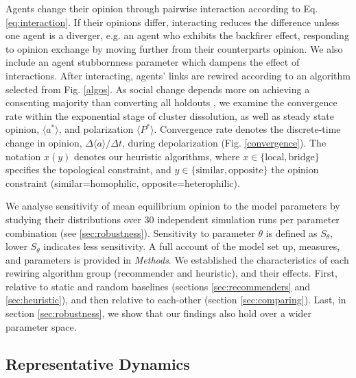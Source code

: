 \documentclass[unnumsec,webpdf,contemporary,large]{oup-authoring-template}%
\theoremstyle{thmstyleone}%
\theoremstyle{thmstyletwo}%
\theoremstyle{thmstylethree}%
\begin{document}
Agents change their opinion through pairwise interaction according to Eq. \ref{eq:interaction}. If their opinions differ, interacting reduces the difference unless one agent is a diverger, e.g. an agent who exhibits the backfirer effect, responding to opinion exchange by moving further from their counterparts opinion. We also include an agent stubbornness parameter which dampens the effect of  interactions. After interacting, agents' links are rewired according to an algorithm selected from Fig. \ref{algos}. As social change depends more on achieving a consenting majority than converting all holdouts \citep{andersson_dynamics_2021,otto_social_2020,gardiner_perfect_2011}, we examine the convergence rate within the exponential stage of cluster dissolution, as well as steady state opinion, $\langle a^* \rangle$, and polarization $\langle P^* \rangle$. Convergence rate denotes the discrete-time change in opinion, $\Delta\langle a\rangle/\Delta t$, during depolarization (Fig. \ref{convergence}). The notation $x(y)$ denotes our heuristic algorithms, where $x \in \{\text{local}, \text{bridge}\}$ specifies the topological constraint, and $y \in \{\text{similar}, \text{opposite}\}$ the opinion constraint (similar=homophilic, opposite=heterophilic).

We analyse sensitivity of mean equilibrium opinion to the model parameters by studying their distributions over 30 independent simulation runs per parameter combination (see \ref{sec:robustness}). Sensitivity to parameter $\theta$ is defined as $S_{\theta}$, lower $S_\theta$ indicates less sensitivity. A full account of the model set up, measures, and parameters is provided in \textit{Methods}. We established the characteristics of each rewiring algorithm group (recommender and heuristic), and their effects. First, relative to static and random baselines (sections \ref{sec:recommenders} and \ref{sec:heuristic}), and then relative to each-other (section \ref{sec:comparing}). Last, in section \ref{sec:robustness}, we show that our findings also hold over a wider parameter space.

\subsection{Representative Dynamics}\label{sec:rep_dynamics}
\end{document}
